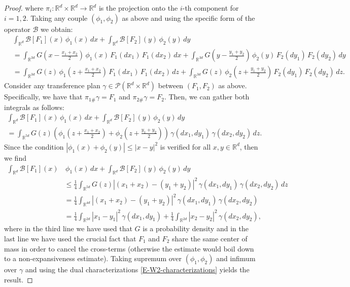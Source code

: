\documentclass[reqno]{amsart}
\numberwithin{equation}{section}
\begin{document}
{\begin{proof}
where $\pi_i:\mathbb{R}^d\times \mathbb{R}^d\rightarrow \mathbb{R}^d$ is the projection onto the $i$-th component for $i=1,2$. Taking any couple $(\phi_1,\phi_2)$ as above and using the specific form of the operator $\mathcal B$ we obtain:
\begin{align*}
&\int_{\mathbb{R}^d} \mathcal{B}[F_1](x) \,\phi_1(x)\, dx +\int_{\mathbb{R}^d} \mathcal{B}[F_2] (y)\,\phi_2(y)\, dy\\
& = \int_{\mathbb{R}^{3d}} G\left(x-\frac{x_1+x_2}{2}\right) \,\phi_1(x)\, F_1(dx_1)\,F_1(dx_2) \,dx + \int_{\mathbb{R}^{3d}} G\left(y-\frac{y_1+y_2}{2}\right) \,\phi_2(y)\, F_2(dy_1)\,F_2(dy_2) \,dy \\
& = \int_{\mathbb{R}^{3d}} G(z) \,\phi_1\left(z+\frac{x_1+x_2}{2}\right)\, F_1(dx_1)\,F_1(dx_2)\,dz + \int_{\mathbb{R}^{3d}} G(z) \,\phi_2\left(z+\frac{y_1+y_2}{2}\right)\, F_2(dy_1) \, F_2(dy_2)\, dz.
\end{align*}
Consider any transference plan $\gamma\in \mathcal{P}(\mathbb{R}^d\times \mathbb{R}^d)$ between $(F_1,F_2)$ as above. Specifically, we have that $\pi_{1\#}\gamma=F_1$ and $\pi_{2\#}\gamma=F_2$. Then, we can gather both integrals as follows:
\begin{multline*}
\int_{\mathbb{R}^d} \mathcal{B}[F_1](x) \,\phi_1(x)\, dx + \int_{\mathbb{R}^d} \mathcal{B}[F_2](y)\,\phi_2(y)\, dy \\ 
= \int_{\mathbb{R}^{5d}} G(z) \left( \phi_1\left(z+\frac{x_1+x_2}{2}\right) +  \phi_2\left(z+\frac{y_1+y_2}{2}\right) \right)  \,  \gamma(dx_1,dy_1) \, \gamma(dx_2,dy_2)\, dz.
\end{multline*}
Since the condition $\left| \phi_1(x) + \phi_2(y)\right| \leq |x-y|^2$ is verified for all $x,y\in \mathbb{R}^d$, then we find
\begin{align*}
\int_{\mathbb{R}^d} \mathcal{B}[F_1](x) &\,\phi_1(x)\, dx  + \int_{\mathbb{R}^d} \mathcal{B}[F_2] (y)\,\phi_2(y)\, dy\\
& \leq \frac{1}{4}  \int_{\mathbb{R}^{5d}} G(z) \left| (x_1+x_2) -  (y_1+y_2)\right|^2  \,  \gamma(dx_1,dy_1)\,\gamma(dx_2,dy_2)\,dz \\
& = \frac{1}{4} \int_{\mathbb{R}^{4d}}  \left| (x_1+x_2) -  (y_1+y_2)\right|^2  \,  \gamma(dx_1,dy_1) \, \gamma(dx_2,dy_2) \\
& = \frac{1}{4}\int_{\mathbb{R}^{2d}}  \left| x_1-y_1\right|^2 \, \gamma(dx_1,dy_1) + \frac{1}{4} \int_{\mathbb{R}^{2d}}  \left| x_2-y_2\right|^2 \, \gamma(dx_2,dy_2),
\end{align*}
where in the third line we have used that $G$ is a probability density and in the last line we have used the crucial fact that $F_1$ and $F_2$ share the same center of mass in order to cancel the cross-terms (otherwise the estimate would boil down to a non-expansiveness estimate). Taking supremum over $(\phi_1,\phi_2)$ and infimum over $\gamma$ and using the dual characterizations \eqref{E-W2-characterizations} yields the result.
\end{proof}

}
\end{document}
